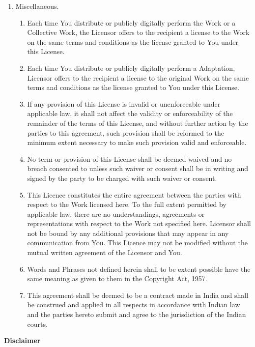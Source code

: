 \begin{enumerate}
    \item{Miscellaneous.}
	\begin{enumerate}
	\item {Each time You distribute or publicly digitally perform the Work or a Collective Work, the Licensor offers to the recipient a license to the Work on the same terms and conditions as the license granted to You under this License.}
	\item {Each time You distribute or publicly digitally perform a Adaptation, Licensor offers to the recipient a license to the original Work on the same terms and conditions as the license granted to You under this License.}
	\item {If any provision of this License is invalid or unenforceable under applicable law, it shall not affect the validity or enforceability of the remainder of the terms of this License, and without further action by the parties to this agreement, such provision shall be reformed to the minimum extent necessary to make such provision valid and enforceable.}
	\item {No term or provision of this License shall be deemed waived and no breach consented to unless such waiver or consent shall be in writing and signed by the party to be charged with such waiver or consent.}
	\item {This Licence constitutes the entire agreement between the parties with respect to the Work licensed here. To the full extent permitted by applicable law, there are no understandings, agreements or representations with respect to the Work not specified here. Licensor shall not be bound by any additional provisions that may appear in any communication from You. This Licence may not be modified without the mutual written agreement of the Licensor and You.}
	\item {Words and Phrases not defined herein shall to be extent possible have the same meaning as given to them in the Copyright Act, 1957.}
	\item {This agreement shall be deemed to be a contract made in India and shall be construed and applied in all respects in accordance with Indian law and the parties hereto submit and agree to the jurisdiction of the Indian courts.}
	\end{enumerate}

\end{enumerate}

\begin{flushleft}
 \textbf{Disclaimer\\}
\end{flushleft}

